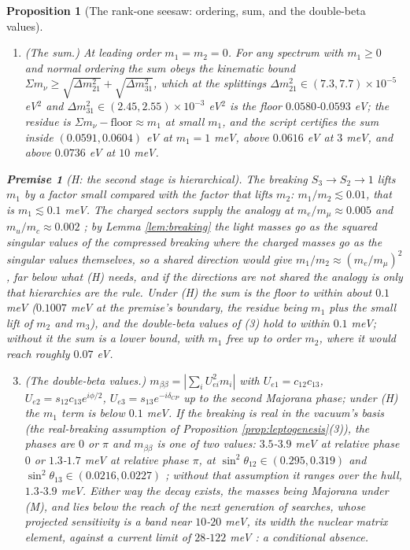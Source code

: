\documentclass[11pt]{article}
\newtheorem{proposition}[theorem]{Proposition}
\theoremstyle{definition}
\newtheorem{premise}[theorem]{Premise}
\newcommand{\mnu}{\Sigma m_{\nu}}
\begin{document}
\begin{proposition}[The rank-one seesaw: ordering, sum, and the double-beta values]
\begin{enumerate}
\item \emph{(The sum.)} At leading order $m_{1} = m_{2} = 0$. For any spectrum with $m_{1} \ge 0$ and normal ordering the sum obeys the kinematic bound $\mnu \ge \sqrt{\Delta m^{2}_{21}} + \sqrt{\Delta m^{2}_{31}}$, which at the splittings $\Delta m^{2}_{21} \in (7.3, 7.7) \times 10^{-5}$ eV$^{2}$ and $\Delta m^{2}_{31} \in (2.45, 2.55) \times 10^{-3}$ eV$^{2}$ \cite{PDG2024, NuFIT2024} is the floor $0.0580$-$0.0593$ eV; the residue is $\mnu - \text{floor} \approx m_{1}$ at small $m_{1}$, and the script certifies the sum inside $(0.0591, 0.0604)$ eV at $m_{1} = 1$ meV, above $0.0616$ eV at $3$ meV, and above $0.0736$ eV at $10$ meV.
\end{enumerate}
\begin{premise}[H: the second stage is hierarchical]\label{prem:H}
The breaking $S_{3} \to S_{2} \to 1$ lifts $m_{1}$ by a factor small compared with the factor that lifts $m_{2}$: $m_{1}/m_{2} \lesssim 0.01$, that is $m_{1} \lesssim 0.1$ meV. The charged sectors supply the analogy at $m_{e}/m_{\mu} \approx 0.005$ and $m_{u}/m_{c} \approx 0.002$ \cite{PDG2024}; by Lemma \ref{lem:breaking} the light masses go as the \emph{squared} singular values of the compressed breaking where the charged masses go as the singular values themselves, so a shared direction would give $m_{1}/m_{2} \approx (m_{e}/m_{\mu})^{2}$, far below what (H) needs, and if the directions are not shared the analogy is only that hierarchies are the rule. Under (H) the sum is the floor to within about $0.1$ meV ($0.1007$ meV at the premise's boundary, the residue being $m_{1}$ plus the small lift of $m_{2}$ and $m_{3}$), and the double-beta values of (3) hold to within $0.1$ meV; without it the sum is a lower bound, with $m_{1}$ free up to order $m_{2}$, where it would reach roughly $0.07$ eV.
\end{premise}
\begin{enumerate}
\setcounter{enumi}{2}
\item \emph{(The double-beta values.)} $m_{\beta\beta} = |\sum_{i}U_{ei}^{2}m_{i}|$ with $U_{e1} = c_{12}c_{13}$, $U_{e2} = s_{12}c_{13}e^{i\phi/2}$, $U_{e3} = s_{13}e^{-i\delta_{CP}}$ up to the second Majorana phase; under (H) the $m_{1}$ term is below $0.1$ meV. If the breaking is real in the vacuum's basis (the real-breaking assumption of Proposition \ref{prop:leptogenesis}(3)), the phases are $0$ or $\pi$ and $m_{\beta\beta}$ is one of two values: $3.5$-$3.9$ meV at relative phase $0$ or $1.3$-$1.7$ meV at relative phase $\pi$, at $\sin^{2}\theta_{12} \in (0.295, 0.319)$ and $\sin^{2}\theta_{13} \in (0.0216, 0.0227)$ \cite{NuFIT2024}; without that assumption it ranges over the hull, $1.3$-$3.9$ meV. Either way the decay exists, the masses being Majorana under (M), and lies below the reach of the next generation of searches, whose projected sensitivity is a band near $10$-$20$ meV, its width the nuclear matrix element, against a current limit of $28$-$122$ meV \cite{LEGEND2021, KamLANDZen2023}: a conditional absence.
\end{enumerate}
\end{proposition}
\end{document}
